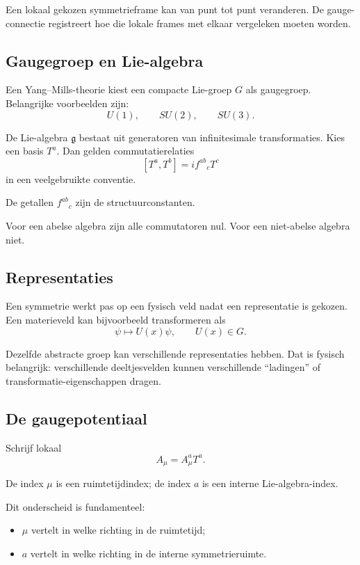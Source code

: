 \documentclass[11pt,a4paper]{article}
\newcommand{\Lie}{\mathfrak{g}}
\begin{document}
\begin{kernidee}
Een lokaal gekozen symmetrieframe kan van punt tot punt veranderen. De gauge-connectie registreert hoe die lokale frames met elkaar vergeleken moeten worden.
\end{kernidee}

\subsection{Gaugegroep en Lie-algebra}

Een Yang--Mills-theorie kiest een compacte Lie-groep $G$ als gaugegroep. Belangrijke voorbeelden zijn:
\[
U(1),\qquad SU(2),\qquad SU(3).
\]

De Lie-algebra $\Lie$ bestaat uit generatoren van infinitesimale transformaties. Kies een basis $T^a$. Dan gelden commutatierelaties
\[
[T^a,T^b]=if^{ab}{}_cT^c
\]
in een veelgebruikte conventie.

De getallen $f^{ab}{}_c$ zijn de structuurconstanten.

Voor een abelse algebra zijn alle commutatoren nul. Voor een niet-abelse algebra niet.

\subsection{Representaties}

Een symmetrie werkt pas op een fysisch veld nadat een representatie is gekozen. Een materieveld kan bijvoorbeeld transformeren als
\[
\psi\mapsto U(x)\psi,
\qquad U(x)\in G.
\]

Dezelfde abstracte groep kan verschillende representaties hebben. Dat is fysisch belangrijk: verschillende deeltjesvelden kunnen verschillende ``ladingen'' of transformatie-eigenschappen dragen.

\subsection{De gaugepotentiaal}

Schrijf lokaal
\[
A_\mu=A_\mu^aT^a.
\]

De index $\mu$ is een ruimtetijdindex; de index $a$ is een interne Lie-algebra-index.

Dit onderscheid is fundamenteel:
\begin{itemize}
    \item $\mu$ vertelt in welke richting in de ruimtetijd;
    \item $a$ vertelt in welke richting in de interne symmetrieruimte.
\end{itemize}
\end{document}
